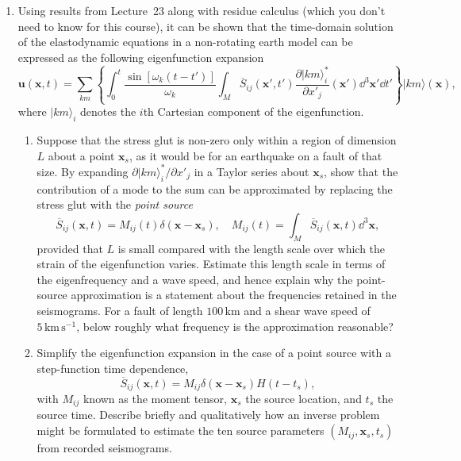 \begin{enumerate}
\item Using results from Lecture~23 along with residue calculus (which you don't need to know for this course), it can be shown that the time-domain solution of the elastodynamic equations in a non-rotating earth model can be expressed as the following eigenfunction expansion
\begin{equation*}
    \mathbf{u}(\mathbf{x},t)=\sum_{km}\left\{\int_{0}^{t}\frac{\sin[\omega_{k}(t-t')]}{\omega_{k}}\int_{M}\overline{S}_{ij}(\mathbf{x}',t')\frac{\partial|km\rangle_{i}^{*}}{\partial x'_{j}}(\mathbf{x}')\dd^{3}\mathbf{x}'\dd t'\right\}|km\rangle(\mathbf{x}),
\end{equation*}
where $|km\rangle_{i}$ denotes the $i$th Cartesian component of the eigenfunction.
\begin{enumerate}
\item Suppose that the stress glut is non-zero only within a region of dimension $L$ about a point $\mathbf{x}_{s}$, as it would be for 
an earthquake on a fault of that size. By expanding $\partial|km\rangle_{i}^{*}/\partial x'_{j}$ in a Taylor series about $\mathbf{x}_{s}$, show that 
the contribution of a mode to the sum can be approximated by replacing the stress glut with the \emph{point source}
\begin{equation*}
    \overline{S}_{ij}(\mathbf{x},t)=M_{ij}(t)\delta(\mathbf{x}-\mathbf{x}_{s}), \quad M_{ij}(t)=\int_{M}\overline{S}_{ij}(\mathbf{x},t)\dd^{3}\mathbf{x},
\end{equation*}
provided that $L$ is small compared with the length scale over which the strain of the eigenfunction varies. Estimate this 
length scale in terms of the eigenfrequency and a wave speed, and hence explain why the point-source approximation is a statement 
about the frequencies retained in the seismograms. For a fault of length $100\,\mathrm{km}$ and a shear wave speed of 
$5\,\mathrm{km\,s^{-1}}$, below roughly what frequency is the approximation reasonable?
\item Simplify the eigenfunction expansion in the case of a point source with a step-function time dependence, 
\begin{equation*}
    \overline{S}_{ij}(\mathbf{x},t)=M_{ij}\delta(\mathbf{x}-\mathbf{x}_{s})H(t-t_{s}),
\end{equation*}
with $M_{ij}$ known as the moment tensor, $\mathbf{x}_{s}$ the source location, and $t_{s}$ the source time. Describe briefly and qualitatively how an inverse problem might be formulated to estimate the ten source parameters $(M_{ij},\mathbf{x}_{s},t_{s})$ from recorded seismograms.
\end{enumerate}


\end{enumerate}
